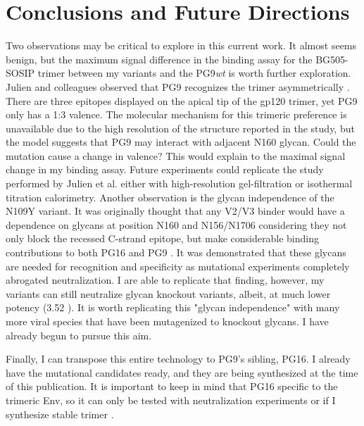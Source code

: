 \section{Conclusions and Future Directions}
Two observations may be critical to explore in this current work. It almost seems benign, but the maximum signal difference in the binding assay for the BG505-SOSIP trimer between my variants and the PG9\textit{wt} is worth further exploration. Julien and colleagues observed that PG9 recognizes the trimer asymmetrically \citep{Julien:2013jp}. There are three epitopes displayed on the apical tip of the gp120 trimer, yet PG9 only has a 1:3 valence. The molecular mechanism for this trimeric preference is unavailable due to the high resolution of the structure reported in the study, but the model suggests that PG9 may interact with adjacent N160 glycan. Could the mutation cause a change in valence? This would explain to the maximal signal change in my binding assay. Future experiments could replicate the study performed by Julien et al. either with high-resolution gel-filtration or isothermal titration calorimetry.
Another observation is the glycan independence of the N109Y variant. It was originally thought that any V2/V3 binder would have a dependence on glycans at position N160 and N156/N1706 considering they not only block the recessed C-strand epitope, but make considerable binding contributions to both PG16 and PG9 \citep{McLellan:2011dg,Pancera:2013ev}. It was demonstrated that these glycans are needed for recognition and specificity as mutational experiments completely abrogated neutralization. I are able to replicate that finding, however, my variants can still neutralize glycan knockout variants, albeit, at much lower potency (3.52 \mcml). It is worth replicating this "glycan independence" with many more viral species that have been mutagenized to knockout glycans. I have already begun to pursue this aim.

Finally, I can transpose this entire technology to PG9's sibling, PG16. I already have the mutational candidates ready, and they are being synthesized at the time of this publication. It is important to keep in mind that PG16 specific to the trimeric Env, so it can only be tested with neutralization experiments or if I synthesize stable trimer \citep{Sanders:2013gm}.




